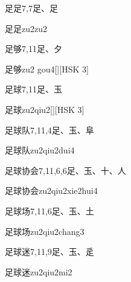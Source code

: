 \begin{entry}{足足}{7,7}{⾜、⾜}
  \begin{phonetics}{足足}{zu2zu2}
  \end{phonetics}
\end{entry}

\begin{entry}{足够}{7,11}{⾜、⼣}
  \begin{phonetics}{足够}{zu2 gou4}[][HSK 3]
  \end{phonetics}
\end{entry}

\begin{entry}{足球}{7,11}{⾜、⽟}
  \begin{phonetics}{足球}{zu2qiu2}[][HSK 3]
  \end{phonetics}
\end{entry}

\begin{entry}{足球队}{7,11,4}{⾜、⽟、⾩}
  \begin{phonetics}{足球队}{zu2qiu2dui4}
  \end{phonetics}
\end{entry}

\begin{entry}{足球协会}{7,11,6,6}{⾜、⽟、⼗、⼈}
  \begin{phonetics}{足球协会}{zu2qiu2xie2hui4}
  \end{phonetics}
\end{entry}

\begin{entry}{足球场}{7,11,6}{⾜、⽟、⼟}
  \begin{phonetics}{足球场}{zu2qiu2chang3}
  \end{phonetics}
\end{entry}

\begin{entry}{足球迷}{7,11,9}{⾜、⽟、⾡}
  \begin{phonetics}{足球迷}{zu2qiu2mi2}
  \end{phonetics}
\end{entry}

